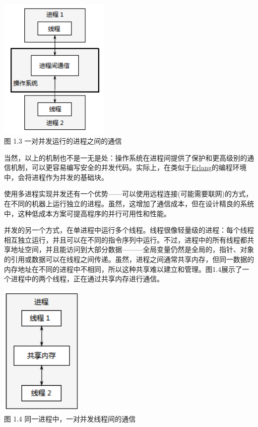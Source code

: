 \begin{center}
    \includegraphics[width=0.4\textwidth]{content/chapter01/images/1-3.png}\\
    图 1.3 一对并发运行的进程之间的通信
\end{center}


当然，以上的机制也不是一无是处：操作系统在进程间提供了保护和更高级别的通信机制，可以更容易编写安全的并发代码。实际上，在类似于\href{www.erlang.org}{Erlang}的编程环境中，会将进程作为并发的基础块。

使用多进程实现并发还有一个优势——可以使用远程连接(可能需要联网)的方式，在不同的机器上运行独立的进程。虽然，这增加了通信成本，但在设计精良的系统中，这种低成本方案可提高程序的并行可用性和性能。


并发的另一个方式，在单进程中运行多个线程。线程很像轻量级的进程：每个线程相互独立运行，并且可以在不同的指令序列中运行。不过，进程中的所有线程都共享地址空间，并且能访问到大部分数据———全局变量仍然是全局的，指针、对象的引用或数据可以在线程之间传递。虽然，进程之间通常共享内存，但同一数据的内存地址在不同的进程中不相同，所以这种共享难以建立和管理。图1.4展示了一个进程中的两个线程，正在通过共享内存进行通信。

\begin{center}
    \includegraphics[width=0.3\textwidth]{content/chapter01/images/1-4.png}\\
    图 1.4 同一进程中，一对并发线程间的通信
\end{center}

